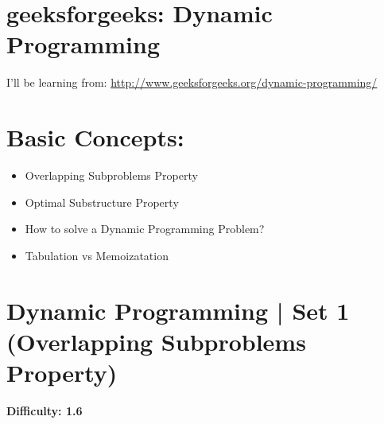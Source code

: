 %
%
%
%
 
\section{geeksforgeeks: Dynamic Programming
  \label{secGFGDPMain}}

I'll be learning from: \url{http://www.geeksforgeeks.org/dynamic-programming/}

\section{Basic Concepts:}

\begin{itemize}%
\item Overlapping Subproblems Property
\item Optimal Substructure Property
\item How to solve a Dynamic Programming Problem?
\item Tabulation vs Memoizatation
\end{itemize}

\section{Dynamic Programming | Set 1 (Overlapping Subproblems Property)
  \label{secGFGDPSet1OverlapSubprob}}

\textbf{Difficulty: 1.6}

